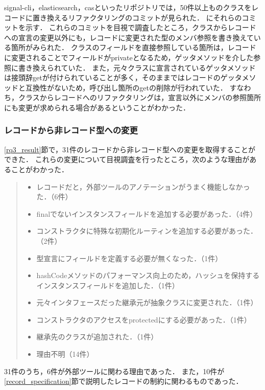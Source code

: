 signal-cli，elasticsearch，casといったリポジトリでは，50件以上ものクラスをレコードに置き換えるリファクタリングのコミットが見られた．
にそれらのコミットを示す．
これらのコミットを目視で調査したところ，クラスからレコードへの宣言の変更以外にも，レコードに変更された型のメンバ参照を書き換えている箇所がみられた．
クラスのフィールドを直接参照している箇所は，レコードに変更されることでフィールドがprivateとなるため，ゲッタメソッドを介した参照に書き換えられていた．
また，元々クラスに宣言されているゲッタメソッドは接頭辞getが付けられていることが多く，そのままではレコードのゲッタメソッドと互換性がないため，呼び出し箇所のgetの削除が行われていた．
すなわち，クラスからレコードへのリファクタリングは，宣言以外にメンバの参照箇所にも変更が求められる場合があるということがわかった．

\subsubsection{レコードから非レコード型への変更}
\ref{rq3_result}節で，31件のレコードから非レコード型への変更を取得することができた．
これらの変更について目視調査を行ったところ，次のような理由があることがわかった．

\begin{quote}
  \begin{itemize}
      \item レコードだと，外部ツールのアノテーションがうまく機能しなかった．（6件）
      \item finalでないインスタンスフィールドを追加する必要があった．（4件）
      \item コンストラクタに特殊な初期化ルーティンを追加する必要があった．（2件）
      \item 型宣言にフィールドを定義する必要が無くなった．（1件）
      \item hashCodeメソッドのパフォーマンス向上のため，ハッシュを保持するインスタンスフィールドを追加した．（1件）
      \item 元々インタフェースだった継承元が抽象クラスに変更された．（1件）
      \item コンストラクタのアクセスをprotectedにする必要があった．（1件）
      \item 継承先のクラスが追加された．（1件）
      \item 理由不明（14件）
  \end{itemize}
\end{quote}

31件のうち，6件が外部ツールに関わる理由であった．
また，10件が\ref{record_specification}節で説明したレコードの制約に関わるものであった．